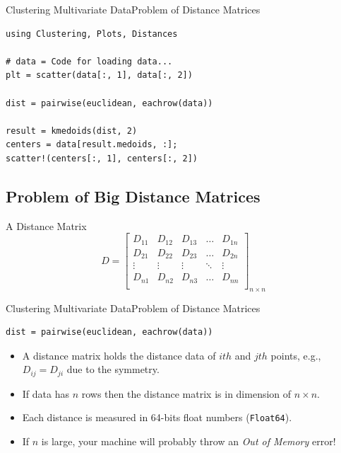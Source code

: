 \documentclass[11pt]{beamer}
\begin{document}
\begin{frame}[fragile]{Clustering Multivariate Data}{Problem of Distance Matrices}
\begin{lstlisting}
using Clustering, Plots, Distances

# data = Code for loading data...
plt = scatter(data[:, 1], data[:, 2])

dist = pairwise(euclidean, eachrow(data))

result = kmedoids(dist, 2)
centers = data[result.medoids, :];
scatter!(centers[:, 1], centers[:, 2])
\end{lstlisting}
\end{frame}

\subsection{Problem of Big Distance Matrices}

\begin{frame}[fragile]{A Distance Matrix}
$$
D = \begin{bmatrix}
D_{11} & D_{12} & D_{13} & \ldots & D_{1n} \\
D_{21} & D_{22} & D_{23} & \ldots & D_{2n} \\
\vdots & \vdots & \vdots & \ddots & \vdots \\
D_{n1} & D_{n2} & D_{n3} & \ldots & D_{nn} \\
\end{bmatrix}_{n \times n}
$$
\end{frame}

\begin{frame}[fragile]{Clustering Multivariate Data}{Problem of Distance Matrices}
\begin{lstlisting}
dist = pairwise(euclidean, eachrow(data))
\end{lstlisting}
\begin{itemize}
	\item A distance matrix holds the distance data of $ith$ and $jth$ points, e.g., $D_{ij} = D_{ji}$ due to the symmetry.
	\item If data has $n$ rows then the distance matrix is in dimension of $n \times n$. 
	\item Each distance is measured in 64-bits float numbers (\texttt{Float64}).
	\item If $n$ is large, your machine will probably throw an \emph{Out of Memory} error!
\end{itemize}
\end{frame}
\end{document}
